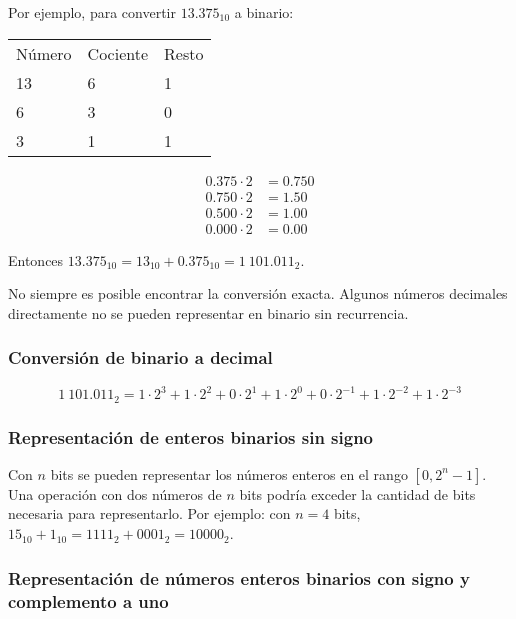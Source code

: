 \documentclass{article}
\begin{document}
Por ejemplo, para convertir $13.375_{10}$ a binario:

\begin{table}[h]
\centering
\begin{tabular}{lll}
    Número & Cociente & Resto \\
    13     & 6        & 1     \\
    6      & 3        & 0     \\
    3      & 1        & 1     \\
\end{tabular}
\end{table}

\begin{align*}
    0.375 \cdot 2 &= 0.750 \\
    0.750 \cdot 2 &= 1.50 \\
    0.500 \cdot 2 &= 1.00 \\
    0.000 \cdot 2 &= 0.00
\end{align*}

Entonces $13.375_{10} = 13_{10} + 0.375_{10} = 1\ 101.011_{2}$.

No siempre es posible encontrar la conversión exacta. Algunos números decimales
directamente no se pueden representar en binario sin recurrencia.

\subsubsection{Conversión de binario a decimal}

\begin{equation*}
    1\ 101.011_{2} = 1\cdot2^3 + 1\cdot2^2 + 0\cdot2^1 + 1\cdot2^0 + 
    0\cdot2^{-1} + 1\cdot2^{-2} + 1\cdot2^{-3}
\end{equation*}

\subsubsection{Representación de enteros binarios sin signo}

Con $n$ bits se pueden representar los números enteros en el rango $[0, 2^n-1]$.
Una operación con dos números de $n$ bits podría exceder la cantidad de bits
necesaria para representarlo. Por ejemplo: con $n=4$ bits,
$15_{10} + 1_{10} = 1111_{2} + 0001_{2} = 10000_{2}$.

\subsubsection{Representación de números enteros binarios con signo y 
complemento a uno}
\end{document}
